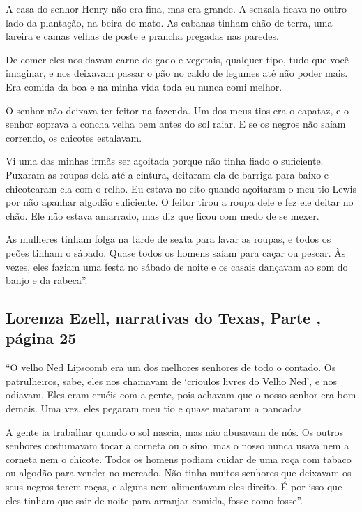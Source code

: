 A casa do senhor Henry não era fina, mas era grande. A senzala ficava no
outro lado da plantação, na beira do mato. As cabanas tinham chão de
terra, uma lareira e camas velhas de poste e prancha pregadas nas
paredes.

De comer eles nos davam carne de gado e vegetais, qualquer tipo, tudo
que você imaginar, e nos deixavam passar o pão no caldo de legumes até
não poder mais. Era comida da boa e na minha vida toda eu nunca comi
melhor.

O senhor não deixava ter feitor na fazenda. Um dos meus tios era o
capataz, e o senhor soprava a concha velha bem antes do sol raiar. E se
os negros não saíam correndo, os chicotes estalavam.

Vi uma das minhas irmãs ser açoitada porque não tinha fiado o
suficiente. Puxaram as roupas dela até a cintura, deitaram ela de
barriga para baixo e chicotearam ela com o relho. Eu estava no eito
quando açoitaram o meu tio Lewis por não apanhar algodão suficiente. O
feitor tirou a roupa dele e fez ele deitar no chão. Ele não estava
amarrado, mas diz que ficou com medo de se mexer.

As mulheres tinham folga na tarde de sexta para lavar as roupas, e todos
os peões tinham o sábado. Quase todos os homens saíam para caçar ou
pescar. Às vezes, eles faziam uma festa no sábado de noite e os casais
dançavam ao som do banjo e da rabeca''.


\subsection{Lorenza Ezell, narrativas do Texas, Parte , página 25} \label{ref86}

``O velho Ned Lipscomb era um dos melhores senhores de todo o contado.
Os patrulheiros, sabe, eles nos chamavam de `crioulos livres do Velho
Ned', e nos odiavam. Eles eram cruéis com a gente, pois achavam que o
nosso senhor era bom demais. Uma vez, eles pegaram meu tio e quase
mataram a pancadas.

A gente ia trabalhar quando o sol nascia, mas não abusavam de nós. Os
outros senhores costumavam tocar a corneta ou o sino, mas o nosso nunca
usava nem a corneta nem o chicote. Todos os homens podiam cuidar de uma
roça com tabaco ou algodão para vender no mercado. Não tinha muitos
senhores que deixavam os seus negros terem roças, e alguns nem
alimentavam eles direito. É por isso que eles tinham que sair de noite
para arranjar comida, fosse como fosse''.

